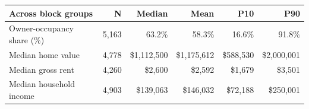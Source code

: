 \begin{tabular}{lrrrrr}
\toprule
Across block groups & N & Median & Mean & P10 & P90 \\
\midrule
Owner-occupancy share (\%) & 5,163 & 63.2\% & 58.3\% & 16.6\% & 91.8\% \\
Median home value & 4,778 & \$1,112,500 & \$1,175,612 & \$588,530 & \$2,000,001 \\
Median gross rent & 4,260 & \$2,600 & \$2,592 & \$1,679 & \$3,501 \\
Median household income & 4,903 & \$139,063 & \$146,032 & \$72,188 & \$250,001 \\
\bottomrule
\end{tabular}
